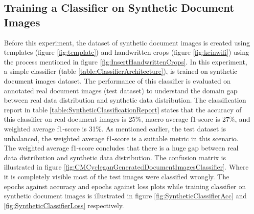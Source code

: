 \subsection{Training a Classifier on Synthetic Document Images}\label{trainingsyntheticclassifier}

Before this experiment, the dataset of synthetic document images is created using templates (figure \ref{fig:template}) and handwritten crops (figure \ref{fig:keinwifi}) using the process mentioned in figure \ref{fig:InsertHandwrittenCrops}. In this experiment, a simple classifier (table \ref{table:ClassifierArchitecture}), is trained on synthetic document images dataset. The performance of this classifier is evaluated on annotated real document images (test dataset) to understand the domain gap between real data distribution and synthetic data distribution. The classification report in table \ref{table:SyntheticClassificationReport} states that the accuracy of this classifier on real document images is 25\%, macro average f1-score is 27\%, and weighted average f1-score is 31\%. As mentioned earlier, the test dataset is unbalanced, the weighted average f1-score is a suitable metric in this scenario. The weighted average f1-score concludes that there is a huge gap between real data distribution and synthetic data distribution. The confusion matrix is illustrated in figure \ref{fig:CMCycleganGeneratedDocumentImagesClassifier}. Where it is completely visible most of the test images were classified wrongly. The epochs against accuracy and epochs against loss plots while training classifier on synthetic document images is illustrated in figure \ref{fig:SyntheticClassifierAcc} and \ref{fig:SyntheticClassifierLoss} respectively.

